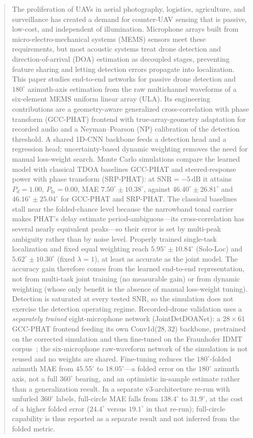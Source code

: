 \documentclass[5p,twocolumn]{elsarticle}
\begin{document}
\begin{frontmatter}
\begin{abstract}
The proliferation of UAVs in aerial photography, logistics, agriculture, and surveillance has created a demand for counter-UAV sensing that is passive, low-cost, and independent of illumination. Microphone arrays built from micro-electro-mechanical systems (MEMS) sensors meet these requirements, but most acoustic systems treat drone detection and direction-of-arrival (DOA) estimation as decoupled stages, preventing feature sharing and letting detection errors propagate into localization. This paper studies end-to-end networks for passive drone detection and $180^\circ$ azimuth-axis estimation from the raw multichannel waveforms of a six-element MEMS uniform linear array (ULA). Its engineering contributions are a geometry-aware generalized cross-correlation with phase transform (GCC-PHAT) frontend with true-array-geometry adaptation for recorded audio and a Neyman--Pearson (NP) calibration of the detection threshold. A shared 1D-CNN backbone feeds a detection head and a regression head; uncertainty-based dynamic weighting removes the need for manual loss-weight search. Monte Carlo simulations compare the learned model with classical TDOA baselines GCC-PHAT and steered-response power with phase transform (SRP-PHAT): at $\mathrm{SNR}=-5\,\mathrm{dB}$ it attains $P_d=1.00$, $P_{\mathrm{fa}}=0.00$, MAE $7.50^\circ\pm10.38^\circ$, against $46.40^\circ\pm26.81^\circ$ and $46.16^\circ\pm25.04^\circ$ for GCC-PHAT and SRP-PHAT. The classical baselines stall near the folded-chance level because the narrowband tonal carrier makes PHAT's delay estimate period-ambiguous---its cross-correlation has several nearly equivalent peaks---so their error is set by multi-peak ambiguity rather than by noise level. Properly trained single-task localization and fixed equal weighting reach $5.95^\circ\pm10.84^\circ$ (Solo-Loc) and $5.62^\circ\pm10.30^\circ$ (fixed $\lambda=1$), at least as accurate as the joint model. The accuracy gain therefore comes from the learned end-to-end representation, not from multi-task joint training (no measurable gain) or from dynamic weighting (whose only benefit is the absence of manual loss-weight tuning). Detection is saturated at every tested SNR, so the simulation does not exercise the detection operating regime. Recorded-drone validation uses a \emph{separately trained} eight-microphone network (JointDetDOANet): a $28\times61$ GCC-PHAT frontend feeding its own Conv1d($28,32$) backbone, pretrained on the corrected simulation and then fine-tuned on the Fraunhofer IDMT corpus~\cite{idmt2025drone}; the six-microphone raw-waveform network of the simulation is not reused and no weights are shared. Fine-tuning reduces the $180^\circ$-folded azimuth MAE from $45.55^\circ$ to $18.05^\circ$---a folded error on the $180^\circ$ azimuth axis, not a full $360^\circ$ bearing, and an optimistic in-sample estimate rather than a generalization result. In a separate v3-architecture re-run with unfurled $360^\circ$ labels, full-circle MAE falls from $138.4^\circ$ to $31.9^\circ$, at the cost of a higher folded error ($24.4^\circ$ versus $19.1^\circ$ in that re-run); full-circle capability is thus reported as a separate result and not inferred from the folded metric.

\end{abstract}
\end{frontmatter}
\end{document}

